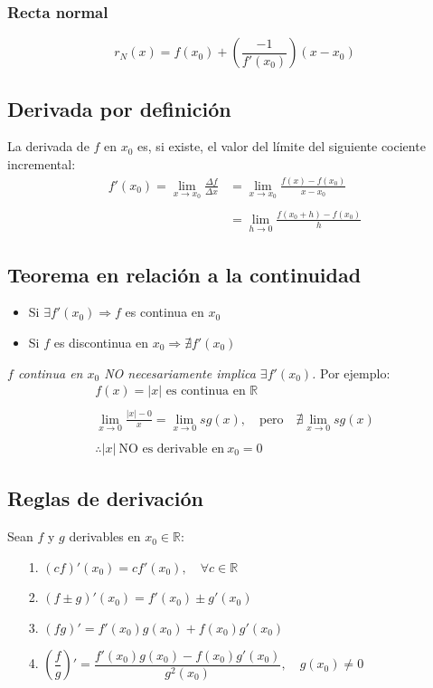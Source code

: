 \documentclass[11pt,titlepage]{article}
\newcommand{\commLim}[2]{\lim_{#1 \to #2}}
\begin{document}
\subsubsection{Recta normal}
\begin{equation}
	r_{N}(x) = f(x_0) + \left(\frac{-1}{f'(x_0)}\right)(x - x_0)
\end{equation}

\subsection{Derivada por definición}
La derivada de $f$ en $x_0$ es, si existe, el valor del límite del siguiente cociente incremental:
\begin{equation}
	\begin{aligned}
		f'(x_0) = \commLim{x}{x_0} \frac{\Delta f}{\Delta x} &= \commLim{x}{x_0} \frac{f(x) - f(x_0)}{x - x_0} \\ \\
		&= \commLim{h}{0} \frac{f(x_{0} + h) - f(x_0)}{h}
	\end{aligned}
\end{equation}

\subsection{Teorema en relación a la continuidad}
\begin{itemize}
	\item Si $\exists f'(x_0) \Rightarrow f$ es continua en $x_0$
	\item Si $f$ es discontinua en $x_0 \Rightarrow \nexists f'(x_0)$
\end{itemize}
\emph{$f$ continua en $x_0$ NO necesariamente implica $\exists f'(x_0)$.} Por ejemplo:
\begin{gather*}
	f(x) = |x| \text{ es continua en } \mathbb{R} \\ \\
	\commLim{x}{0} \frac{|x| - 0}{x} = \commLim{x}{0} sg(x), \quad \text{pero} \quad \nexists \commLim{x}{0} sg(x) \\ \\
	\therefore |x| \ \text{NO es derivable en} \ x_0 = 0
\end{gather*}

\subsection{Reglas de derivación}
Sean $f$ y $g$ derivables en $x_0 \in \mathbb{R}$:
\begin{itemize}
	\item[1.] $(cf)'(x_0) = cf'(x_0), \quad \forall c \in \mathbb{R}$
	\item[2.] $(f \pm g)'(x_0) = f'(x_0) \pm g'(x_0)$ 
	\item[3.] $(fg)' = f'(x_0)g(x_0) + f(x_0)g'(x_0)$
	\item[4.] $\left(\dfrac{f}{g}\right)' = \dfrac{f'(x_0)g(x_0) - f(x_0)g'(x_0)}{g^{2}(x_0)}, \quad g(x_0) \neq 0$
\end{itemize}
\end{document}
